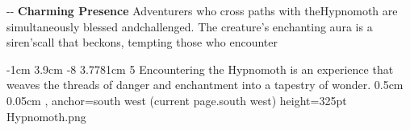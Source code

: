 \begin{adjustwidth}{0em}{-\linewidth -\columnsep}
\hspace*{5em}\textbf{Charming Presence} Adventurers who cross paths with the\hspace*{22em}\phantom{d}\vspace*{-1.2\fontdimen6\font}\linebreak\hspace*{33.75em}Hypnomoth are simultaneously blessed and\linebreak\hspace*{6.5em}challenged. The creature's enchanting aura is a siren's\hspace*{23em}\phantom{d}\vspace*{-1.2\fontdimen6\font}\linebreak\hspace*{33.4em}call that beckons, tempting those who encounter\linebreak
\end{adjustwidth}


{%
	{-1cm}%
	{3.9cm}%
	{-8}%
	{3.7781cm}%
	{5}%
	{%
		Encountering the Hypnomoth is an experience that weaves the threads of danger and enchantment into a tapestry of wonder.%
	}%
}%
{0.5cm}%
{0.05cm}%
{, anchor=south west}%
{(current page.south west)}%
{height=325pt}%
{Hypnomoth.png}%
%


